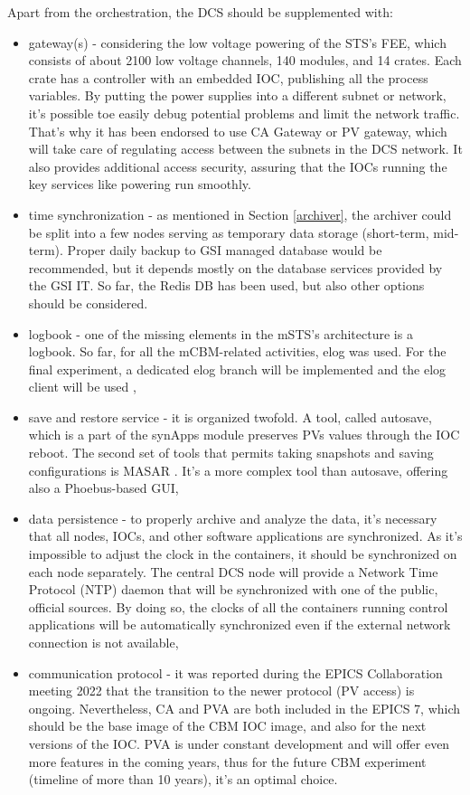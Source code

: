 Apart from the orchestration, the \gls{DCS} should be supplemented with:
 \begin{itemize}
      \item gateway(s) - considering the low voltage powering of the STS's \gls{FEE}, which consists of about 2100 low voltage channels, 140 modules, and 14 crates. Each crate has a controller with an embedded \gls{IOC}, publishing all the process variables. By putting the power supplies into a different subnet or network, it's possible toe easily debug potential problems and limit the network traffic. That's why it has been endorsed to use CA Gateway \cite{gateway} or \gls{PV} gateway, which will take care of regulating access between the subnets in the DCS network. It also provides additional access security, assuring that the \glspl{IOC} running the key services like powering run smoothly.
     \item time synchronization - as mentioned in Section \ref{archiver}, the archiver could be split into a few nodes serving as temporary data storage (short-term, mid-term). Proper daily backup to GSI managed database would be recommended, but it depends mostly on the database services provided by the GSI IT. So far, the Redis DB has been used, but also other options should be considered.       
     \item logbook - one of the missing elements in the \gls{mSTS}'s architecture is a logbook. So far, for all the mCBM-related activities, elog \cite{elog} was used. For the final experiment, a dedicated elog branch will be implemented and the elog client will be used \cite{elog_client},
     \item save and restore service - it is organized twofold. A tool, called autosave, which is a part of the synApps module \cite{autosave} preserves \glspl{PV} values through the \gls{IOC} reboot. The second set of tools that permits taking snapshots and saving configurations is MASAR \cite{masar}. It's a more complex tool than autosave, offering also a Phoebus-based \gls{GUI},
     \item data persistence - to properly archive and analyze the data, it's necessary that all nodes, \glspl{IOC}, and other software applications are synchronized. As it's impossible to adjust the clock in the containers, it should be synchronized on each node separately. The central \gls{DCS} node will provide a Network Time Protocol (\gls{NTP}) daemon that will be synchronized with one of the public, official sources.  By doing so, the clocks of all the containers running control applications will be automatically synchronized even if the external network connection is not available,
     \item communication protocol - it was reported during the EPICS Collaboration meeting 2022 \cite{epics_2022} that the transition to the newer protocol (PV access) is ongoing. Nevertheless, CA and PVA are both included in the EPICS 7, which should be the base image of the \gls{CBM} \gls{IOC} image, and also for the next versions of the \gls{IOC}. PVA is under constant development and will offer even more features in the coming years, thus for the future CBM experiment (timeline of more than 10 years), it's an optimal choice. 
 \end{itemize}


